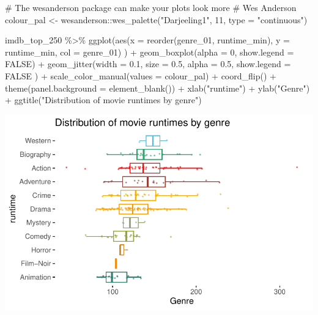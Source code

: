 \documentclass[
  letterpaper,
]{krantz}
\makeatletter
\newenvironment{Shaded}{\begin{snugshade}}{\end{snugshade}}
\newcommand{\AttributeTok}[1]{\textcolor[rgb]{0.40,0.45,0.13}{#1}}
\newcommand{\CommentTok}[1]{\textcolor[rgb]{0.37,0.37,0.37}{#1}}
\newcommand{\ConstantTok}[1]{\textcolor[rgb]{0.56,0.35,0.01}{#1}}
\newcommand{\DecValTok}[1]{\textcolor[rgb]{0.68,0.00,0.00}{#1}}
\newcommand{\FloatTok}[1]{\textcolor[rgb]{0.68,0.00,0.00}{#1}}
\newcommand{\FunctionTok}[1]{\textcolor[rgb]{0.28,0.35,0.67}{#1}}
\newcommand{\NormalTok}[1]{\textcolor[rgb]{0.00,0.23,0.31}{#1}}
\newcommand{\OtherTok}[1]{\textcolor[rgb]{0.00,0.23,0.31}{#1}}
\newcommand{\SpecialCharTok}[1]{\textcolor[rgb]{0.37,0.37,0.37}{#1}}
\newcommand{\StringTok}[1]{\textcolor[rgb]{0.13,0.47,0.30}{#1}}
\newenvironment{kframe}{%
\medskip{}
\setlength{\fboxsep}{.8em}
 \def\at@end@of@kframe{}%
 \ifinner\ifhmode%
  \def\at@end@of@kframe{\end{minipage}}%
  \begin{minipage}{\columnwidth}%
 \fi\fi%
 \def\FrameCommand##1{\hskip\@totalleftmargin \hskip-\fboxsep
 \colorbox{shadecolor}{##1}\hskip-\fboxsep
     \hskip-\linewidth \hskip-\@totalleftmargin \hskip\columnwidth}%
 \MakeFramed {\advance\hsize-\width
   \@totalleftmargin\z@ \linewidth\hsize
   \@setminipage}}%
 {\par\unskip\endMakeFramed%
 \at@end@of@kframe}
\renewenvironment{Shaded}{\begin{kframe}}{\end{kframe}}
\makeatother
\begin{document}
\begin{Shaded}
\begin{Highlighting}[]
\CommentTok{\# The wesanderson package can make your plots look more}
\CommentTok{\# \textquotesingle{}Wes Anderson\textquotesingle{}}
\NormalTok{colour\_pal }\OtherTok{\textless{}{-}}\NormalTok{ wesanderson}\SpecialCharTok{::}\FunctionTok{wes\_palette}\NormalTok{(}\StringTok{"Darjeeling1"}\NormalTok{, }\DecValTok{11}\NormalTok{, }\AttributeTok{type =} \StringTok{"continuous"}\NormalTok{)}

\NormalTok{imdb\_top\_250 }\SpecialCharTok{\%\textgreater{}\%}
  \FunctionTok{ggplot}\NormalTok{(}\FunctionTok{aes}\NormalTok{(}\AttributeTok{x =} \FunctionTok{reorder}\NormalTok{(genre\_01, runtime\_min),}
             \AttributeTok{y =}\NormalTok{ runtime\_min,}
             \AttributeTok{col =}\NormalTok{ genre\_01)}
\NormalTok{         ) }\SpecialCharTok{+}
  \FunctionTok{geom\_boxplot}\NormalTok{(}\AttributeTok{alpha =} \DecValTok{0}\NormalTok{,}
               \AttributeTok{show.legend =} \ConstantTok{FALSE}\NormalTok{) }\SpecialCharTok{+}
  \FunctionTok{geom\_jitter}\NormalTok{(}\AttributeTok{width =} \FloatTok{0.1}\NormalTok{,}
              \AttributeTok{size =} \FloatTok{0.5}\NormalTok{,}
              \AttributeTok{alpha =} \FloatTok{0.5}\NormalTok{,}
              \AttributeTok{show.legend =} \ConstantTok{FALSE}
\NormalTok{              ) }\SpecialCharTok{+}
  \FunctionTok{scale\_color\_manual}\NormalTok{(}\AttributeTok{values =}\NormalTok{ colour\_pal) }\SpecialCharTok{+}
  \FunctionTok{coord\_flip}\NormalTok{() }\SpecialCharTok{+}
  \FunctionTok{theme}\NormalTok{(}\AttributeTok{panel.background =} \FunctionTok{element\_blank}\NormalTok{()) }\SpecialCharTok{+}
  \FunctionTok{xlab}\NormalTok{(}\StringTok{"runtime"}\NormalTok{) }\SpecialCharTok{+}
  \FunctionTok{ylab}\NormalTok{(}\StringTok{"Genre"}\NormalTok{) }\SpecialCharTok{+}
  \FunctionTok{ggtitle}\NormalTok{(}\StringTok{"Distribution of movie runtimes by genre"}\NormalTok{)}
\end{Highlighting}
\end{Shaded}

\includegraphics{09_sources_of_bias_files/figure-pdf/final-plot-outliers-1.pdf}
\end{document}
